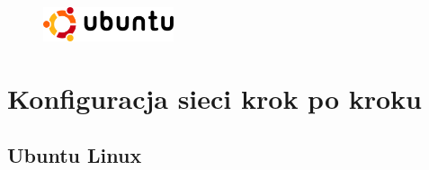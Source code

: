 \documentclass[a4paper,12pt]{scrartcl}
\begin{document}
\newpage
\enlargethispage{25pt}

\begin{figure}[t!]
    \raggedleft
    \vspace{-20pt}
    \includegraphics[height=1cm,keepaspectratio]{Bilder/Ubuntu_logo}
    \vspace{-20pt}
\end{figure}

\section*{Konfiguracja sieci krok po kroku}
\subsection*{Ubuntu Linux}
\end{document}
